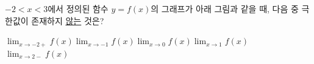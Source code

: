 $-2<x<3$에서 정의된 함수 $y=f(x)$의 그래프가 아래 그림과 같을 때, 다음 중 극한값이 존재하지 \underline{않는} 것은?
\par\smallskip\begin{center}\resizebox{\ifdim\width>\linewidth\linewidth\else\width\fi}{!}{}\end{center}
\begin{choicesii}{$\displaystyle\lim_{x\to-2+} f(x)$}{$\displaystyle\lim_{x\to-1} f(x)$}{$\displaystyle\lim_{x\to 0} f(x)$}{$\displaystyle\lim_{x\to 1} f(x)$}{$\displaystyle\lim_{x\to 2-} f(x)$}\end{choicesii}
